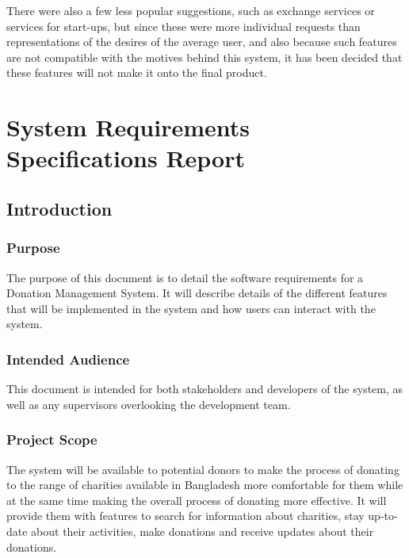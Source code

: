 \documentclass{scrreprt}
\begin{document}
    There were also a few less popular suggestions, such as exchange services or services for start-ups, but since these were more individual requests than representations of the desires of the average user, and also because such features are not compatible with the motives behind this system, it has been decided that these features will not make it onto the final product.
    
    \section{System Requirements Specifications Report}
    
        \subsection{Introduction}
    
            \subsubsection{Purpose}
    
                The purpose of this document is to detail the software requirements for a Donation Management System. It will describe details of the different features that will be implemented in the system and how users can interact with the system.\par
    
            \subsubsection{Intended Audience}
    
                This document is intended for both stakeholders and developers of the system, as well as any supervisors overlooking the development team.\par
    
            \subsubsection{Project Scope}
    
                The system will be available to potential donors to make the process of donating to the range of charities available in Bangladesh more comfortable for them while at the same time making the overall process of donating more effective. It will provide them with features to search for information about charities, stay up-to-date about their activities, make donations and receive updates about their donations.\par
    
\end{document}
